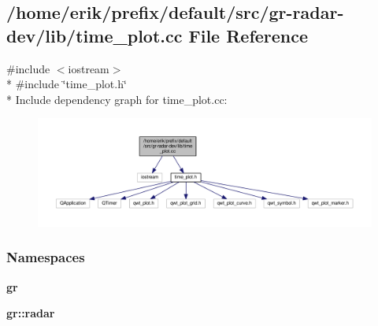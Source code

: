 \subsection{/home/erik/prefix/default/src/gr-\/radar-\/dev/lib/time\+\_\+plot.cc File Reference}
\label{time__plot_8cc}
{\ttfamily \#include $<$iostream$>$}\\*
{\ttfamily \#include \char`\"{}time\+\_\+plot.\+h\char`\"{}}\\*
Include dependency graph for time\+\_\+plot.\+cc\+:
\nopagebreak
\begin{figure}[H]
\begin{center}
\leavevmode
\includegraphics[width=350pt]{d9/d14/time__plot_8cc__incl}
\end{center}
\end{figure}
\subsubsection*{Namespaces}
\begin{DoxyCompactItemize}
\item 
 {\bf gr}
\item 
 {\bf gr\+::radar}
\end{DoxyCompactItemize}
